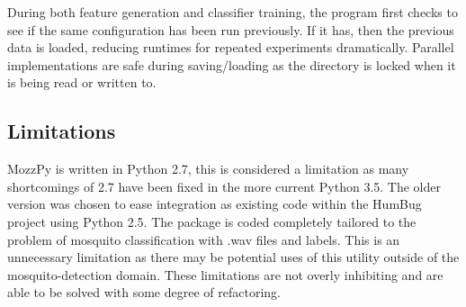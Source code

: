         During both feature generation and classifier training, the program first checks to see if the same configuration has been run previously. If it has, then the previous data is loaded, reducing runtimes for repeated experiments dramatically. Parallel implementations are safe during saving/loading as the directory is locked when it is being read or written to.
   
    \subsection{Limitations}
    \label{subsec:pl-mozzpy-limit}
        MozzPy is written in Python 2.7, this is considered a limitation as many shortcomings of 2.7 have been fixed in the more current Python 3.5. The older version was chosen to ease integration as existing code within the HumBug project using Python 2.5. The package is coded completely tailored to the problem of mosquito classification with .wav files and labels. This is an unnecessary limitation as there may be potential uses of this utility outside of the mosquito-detection domain. These limitations are not overly inhibiting and are able to be solved with some degree of refactoring.
